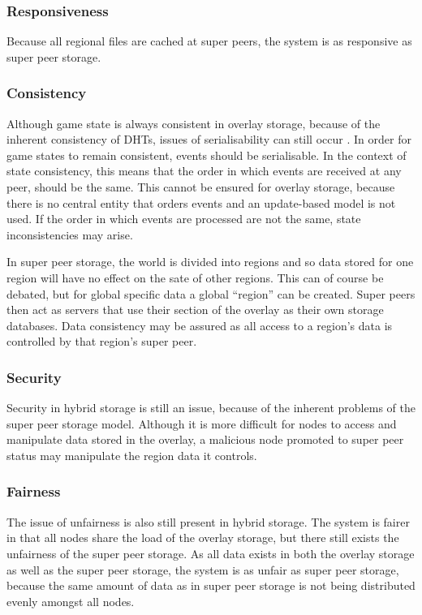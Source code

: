 \documentclass[10pt,a4paper,journal,cspaper,compsoc]{IEEEtran}
\begin{document}
\subsubsection{Responsiveness}

Because all regional files are cached at super peers, the system is as responsive as super peer storage.

\subsubsection{Consistency}

Although game state is always consistent in overlay storage, because of the inherent consistency of DHTs, issues of serialisability can still occur
\cite{zoned_federation}. In order for game states to remain consistent, events should be serialisable. In the context of state consistency, this
means that the order in which events are received at any peer, should be the same. This cannot be ensured for overlay storage, because there is no
central entity that orders events and an update-based model is not used. If the order in which events are processed are not the same, state
inconsistencies may arise.

In super peer storage, the world is divided into regions and so data stored for one region will have no effect on the sate of other regions. This can
of course be debated, but for global specific data a global ``region'' can be created. Super peers then act as servers that use their section of the
overlay as their own storage databases. Data consistency may be assured as all access to a region's data is controlled by that region's super peer.

\subsubsection{Security}

Security in hybrid storage is still an issue, because of the inherent problems of the super peer storage model. Although it is more difficult for
nodes to access and manipulate data stored in the overlay, a malicious node promoted to super peer status may manipulate the region data it controls.

\subsubsection{Fairness}

The issue of unfairness is also still present in hybrid storage. The system is fairer in that all nodes share the load of the overlay storage, but
there still exists the unfairness of the super peer storage. As all data exists in both the overlay storage as well as the super peer storage, the
system is as unfair as super peer storage, because the same amount of data as in super peer storage is not being distributed evenly amongst all
nodes.
\end{document}
